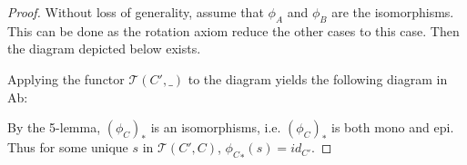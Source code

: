     \begin{proof}
        Without loss of generality, assume that $\phi_A$ and $\phi_B$ are the isomorphisms. This can be done as the rotation axiom reduce the other cases to this case. Then the diagram depicted below exists.
        \begin{center}
        \end{center}
        Applying the functor $\mathcal{T}(C',\_)$ to the diagram yields the following diagram in Ab:
        \begin{center}
        \end{center}
        By the 5-lemma, $(\phi_C)_*$ is an isomorphisms, i.e. $(\phi_C)_*$ is both mono and epi. Thus for some unique $s$ in $\mathcal{T}(C',C)$, ${\phi_C}_*(s)=id_{C'}$. 


\end{proof}
